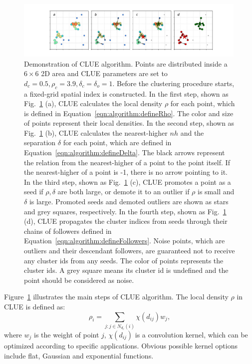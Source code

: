 \begin{figure}[ht]
    \centering
    \includegraphics[trim=5cm 0cm 4cm 0cm, clip,width=0.99\textwidth]{chapters/HGCal/figures/clue/Figure2.pdf}
    \caption{Demonstration of CLUE algorithm. Points are distributed inside a $6\times6$ 2D area and CLUE parameters are set to $d_c=0.5,\rho_c=3.9,\delta_c=\delta_o=1$. Before the clustering procedure starts, a fixed-grid spatial index is constructed. In the first step, shown as Fig.~\ref{fig:algorithm:procedure} (a), CLUE calculates the local density $\rho$ for each point, which is defined in Equation~\ref{eqn:algorithm:defineRho}. The color and size of points represent their local densities. In the second step, shown as Fig.~\ref{fig:algorithm:procedure} (b), CLUE calculates the nearest-higher $nh$ and the separation $\delta$ for each point, which are defined in Equation~\ref{eqn:algorithm:defineDelta}. The black arrows represent the relation from the nearest-higher of a point to the point itself. If the nearest-higher of a point is -1, there is no arrow pointing to it. In the third step, shown as Fig.~\ref{fig:algorithm:procedure} (c), CLUE promotes a point as a seed if $\rho,\delta$ are both large, or demote it to an outlier if $\rho$ is small and $\delta$ is large. Promoted seeds and demoted outliers are shown as stars and grey squares, respectively. In the fourth step, shown as Fig.~\ref{fig:algorithm:procedure} (d), CLUE propagates the cluster indices from seeds through their chains of followers defined in Equation~\ref{eqn:algorithm:defineFollowers}. Noise points, which are outliers and their descendant followers, are guaranteed not to receive any cluster ids from any seeds. The color of points represents the cluster ids. A grey square means its cluster id is undefined and the point should be considered as noise.
    }
    \label{fig:algorithm:procedure}
\end{figure}


Figure~\ref{fig:algorithm:procedure} illustrates the main steps of CLUE algorithm. The local density $\rho$ in CLUE is defined as:
\begin{equation} \label{eqn:algorithm:defineRho}
    \rho_i = \sum_{j: j \in N_{d_c}(i)} \chi(d_{ij}) w_j,
\end{equation}
\noindent where $w_j$ is the weight of point $j$, $\chi(d_{ij})$ is a convolution kernel, which can be optimized according to specific applications. Obvious possible kernel options include flat, Gaussian and exponential functions. 

